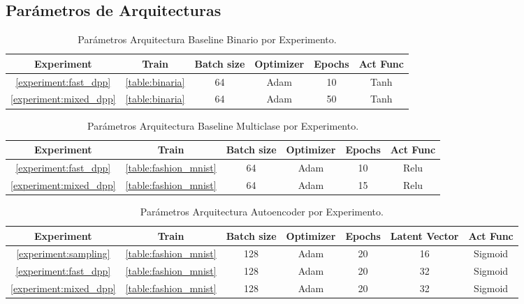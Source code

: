 \begin{appendixs}
  
  
  
  \section{Parámetros de Arquitecturas}
  
  \begin{table}[ht]
    \begin{tabular}{|c|c|c|c|c|c|}
    \hline
    Experiment & Train & Batch size & Optimizer & Epochs &  Act Func \\ \hline

    \ref{experiment:fast_dpp}      & \ref{table:binaria}    & 64        & Adam      & 10                & Tanh         \\ \hline
    \ref{experiment:mixed_dpp}      & \ref{table:binaria}    & 64        & Adam      & 50                 & Tanh         \\ \hline

    \end{tabular}
    \caption{Parámetros Arquitectura Baseline Binario por Experimento.}
    \label{table:baseline2d_parameters}
    \end{table}
    
   \begin{table}[ht]
    \begin{tabular}{|c|c|c|c|c|c|}
    \hline
    Experiment & Train & Batch size & Optimizer & Epochs &  Act Func \\ \hline

    \ref{experiment:fast_dpp}      & \ref{table:fashion_mnist}    & 64        & Adam      & 10                & Relu         \\ \hline
    \ref{experiment:mixed_dpp}      & \ref{table:fashion_mnist}    & 64        & Adam      & 15                 & Relu         \\ \hline

    \end{tabular}
    \caption{Parámetros Arquitectura Baseline Multiclase por Experimento.}
    \label{table:conv_parameters}
    \end{table}
  
  \begin{table}[ht]
    \begin{tabular}{|c|c|c|c|c|c|c|}
    \hline
    Experiment & Train & Batch size & Optimizer & Epochs & Latent Vector & Act Func \\ \hline
    \ref{experiment:sampling}      & \ref{table:fashion_mnist}   & 128        & Adam      & 20     & 16                & Sigmoid         \\ \hline
    \ref{experiment:fast_dpp}      & \ref{table:fashion_mnist}    & 128        & Adam      & 20     & 32                & Sigmoid         \\ \hline
    \ref{experiment:mixed_dpp}      & \ref{table:fashion_mnist}    & 128        & Adam      & 20     & 32                & Sigmoid         \\ \hline
    \end{tabular}
    \caption{Parámetros Arquitectura Autoencoder por Experimento.}
    \label{table:autoencoder_parameters}
    \end{table}
  

\end{appendixs}
